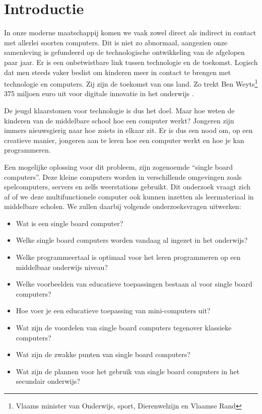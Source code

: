 
\section{Introductie} %
\label{sec:introductie}

In onze moderne maatschappij komen we vaak zowel direct als indirect in contact met allerlei soorten computers. Dit is niet zo abnormaal, aangezien onze samenleving is gefundeerd op de technologische ontwikkeling van de afgelopen paar jaar. Er is een onbetwistbare link tussen technologie en de toekomst. 
Logisch dat men steeds vaker beslist om kinderen meer in contact te brengen met technologie en computers. Zij zijn de toekomst van ons land. Zo trekt Ben Weyts\footnote{Vlaams minister van Onderwijs, sport, Dierenwelzijn en Vlaamse Rand} 375 miljoen euro uit voor digitale innovatie in het onderwijs \autocite{ArnoutGyssels2020}. 

De jeugd klaarstomen voor technologie is dus het doel.  Maar hoe weten de kinderen van de middelbare school hoe een computer werkt? Jongeren zijn immers nieuwsgierig naar hoe zoiets in elkaar zit. Er is dus een nood om, op een creatieve manier, jongeren aan te leren hoe een computer werkt en hoe je kan programmeren. 

Een mogelijke oplossing voor dit probleem, zijn zogenoemde “single board computers”. Deze kleine computers worden in verschillende omgevingen zoals spelcomputers, servers en zelfs weerstations gebruikt. Dit onderzoek vraagt zich af of we deze multifunctionele computer ook kunnen inzetten als leermateriaal in middelbare scholen. We zullen daarbij volgende onderzoeksvragen uitwerken:

\begin{itemize}
  \item Wat is een single board computer?
  \item Welke single board computers worden vandaag al ingezet in het onderwijs?
  \item Welke programmeertaal is optimaal voor het leren programmeren op een middelbaar onderwijs niveau?
  \item Welke voorbeelden van educatieve toepassingen bestaan al voor single board computers?
  \item Hoe voer je een educatieve toepassing van mini-computers uit?
  \item Wat zijn de voordelen van single board computers tegenover klassieke computers?
  \item Wat zijn de zwakke punten van single board computers?
  \item Wat zijn de plannen voor het gebruik van single board computers in het secundair onderwijs?
\end{itemize}

